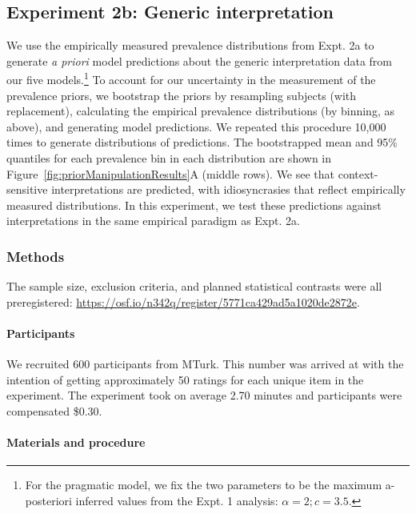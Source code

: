 \documentclass[floatsintext,doc]{apa6}
\let\oldparagraph\paragraph
\renewcommand{\paragraph}[1]{\oldparagraph{#1}\mbox{}}
\let\rmarkdownfootnote\footnote%
\def\footnote{\protect\rmarkdownfootnote}
\begin{document}
\hypertarget{experiment-2b-generic-interpretation}{%
\subsection{Experiment 2b: Generic interpretation}\label{experiment-2b-generic-interpretation}}

We use the empirically measured prevalence distributions from Expt. 2a to generate \emph{a priori} model predictions about the generic interpretation data from our five models.\footnote{For the pragmatic model, we fix the two parameters to be the maximum a-posteriori inferred values from the Expt. 1 analysis: \(\alpha = 2; c = 3.5\).}
To account for our uncertainty in the measurement of the prevalence priors, we bootstrap the priors by resampling subjects (with replacement), calculating the empirical prevalence distributions (by binning, as above), and generating model predictions.
We repeated this procedure 10,000 times to generate distributions of predictions.
The bootstrapped mean and 95\% quantiles for each prevalence bin in each distribution are shown in Figure~\ref{fig:priorManipulationResults}A (middle rows).
We see that context-sensitive interpretations are predicted, with idiosyncrasies that reflect empirically measured distributions.
In this experiment, we test these predictions against interpretations in the same empirical paradigm as Expt. 2a.

\hypertarget{methods-3}{%
\subsubsection{Methods}\label{methods-3}}

The sample size, exclusion criteria, and planned statistical contrasts were all preregistered: \url{https://osf.io/n342q/register/5771ca429ad5a1020de2872e}.

\hypertarget{participants-4}{%
\paragraph{Participants}\label{participants-4}}

We recruited 600 participants from MTurk.
This number was arrived at with the intention of getting approximately 50 ratings for each unique item in the experiment.
The experiment took on average 2.70 minutes and participants were compensated \$0.30.

\hypertarget{materials-and-procedure}{%
\paragraph{Materials and procedure}\label{materials-and-procedure}}
\end{document}
